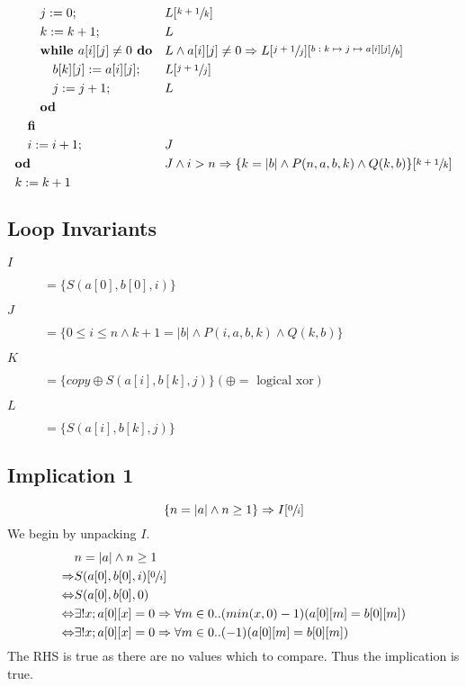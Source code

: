 \documentclass[a4paper]{article}
\begin{document}
\begin{align*}
		& \qquad j := 0; && L[\sfrac{k+1}{k}] \\
		& \qquad k := k + 1; && L \\
		& \qquad \textbf{while } a[i][j] \neq 0 \textbf{ do}  && L \land a[i][j] \neq 0 \Rightarrow L[\sfrac{j+1}{j}][\sfrac{b:k\mapsto j \mapsto a[i][j]}{b}] \\
		& \qquad \quad b[k][j] := a[i][j]; && L[\sfrac{j+1}{j}]\\
		& \qquad \quad j := j + 1; && L\\
		& \qquad \textbf{od} \\
		& \quad \textbf{fi} && \\
		& \quad i := i + 1; && J \\
		& \textbf{od} && J \land i > n \Rightarrow \{k = |b| \land P(n, a, b, k) \land Q(k, b)\}[\sfrac{k+1}{k}] \\
		& k := k + 1
\end{align*}


\subsection{Loop Invariants}
\begin{description}
		\item[$I$] $= \{S(a[0], b[0], i)\}$
		\item[$J$] $= \{0 \leq i \leq n \land k + 1 = |b| \land P(i, a, b, k) \land Q(k, b)\} $
		\item[$K$] $= \{copy \oplus S(a[i], b[k], j) \} (\oplus = \text{ logical xor})$
		\item[$L$] $= \{S(a[i], b[k], j)\}$
\end{description}
		
		

\subsection{Implication 1}
$$ \{n = |a| \land n \geq 1 \} \Rightarrow I[\sfrac{0}{i}] $$
We begin by unpacking $I$.
\begin{align*}
		& n = |a| \land n \geq 1 \\
		\Rightarrow & { S(a[0], b[0], i) }[\sfrac{0}{i}] \\
		\Leftrightarrow & S(a[0], b[0], 0) \\
		\Leftrightarrow & \exists! x;a[0][x] = 0 \Rightarrow \forall m \in 0..(min(x, 0) - 1)(a[0][m] = b[0][m]) \\
		\Leftrightarrow & \exists! x;a[0][x] = 0 \Rightarrow \forall m \in 0..(-1)(a[0][m] = b[0][m]) \\
\end{align*}
The RHS is true as there are no values which to compare. Thus the implication is true.
\end{document}
